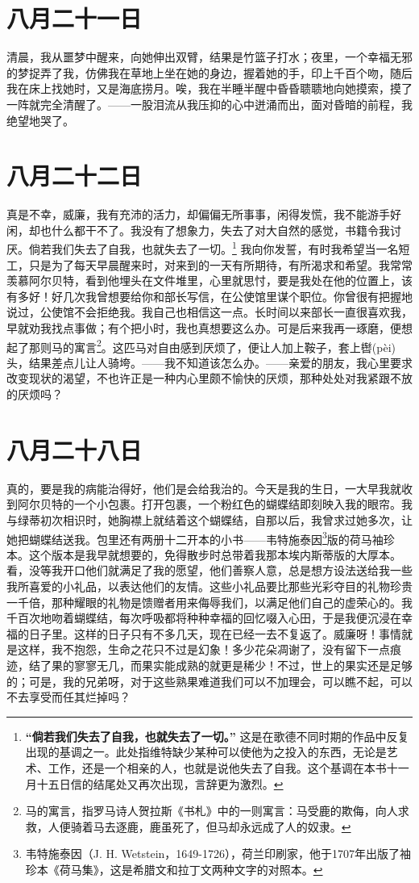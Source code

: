\documentclass[12pt,oneside]{book}
\begin{document}
\chapter{八月二十一日}
\label{sec-2-35}
清晨，我从噩梦中醒来，向她伸出双臂，结果是竹篮子打水；夜里，一个幸福无邪的梦捉弄了我，仿佛我在草地上坐在她的身边，握着她的手，印上千百个吻，随后我在床上找她时，又是海底捞月。唉，我在半睡半醒中昏昏聩聩地向她摸索，摸了一阵就完全清醒了。——一股泪流从我压抑的心中迸涌而出，面对昏暗的前程，我绝望地哭了。


\chapter{八月二十二日}
\label{sec-2-36}
真是不幸，威廉，我有充沛的活力，却偏偏无所事事，闲得发慌，我不能游手好闲，却也什么都干不了。我没有了想象力，失去了对大自然的感觉，书籍令我讨厌。倘若我们失去了自我，也就失去了一切。\footnote{\textbf{“倘若我们失去了自我，也就失去了一切。”} 这是在歌德不同时期的作品中反复出现的基调之一。此处指维特缺少某种可以使他为之投入的东西，无论是艺术、工作，还是一个相亲的人，也就是说他失去了自我。这个基调在本书十一月十五日信的结尾处又再次出现，言辞更为激烈。} 我向你发誓，有时我希望当一名短工，只是为了每天早晨醒来时，对来到的一天有所期待，有所渴求和希望。我常常羡慕阿尔贝特，看到他埋头在文件堆里，心里就思忖，要是我处在他的位置上，该有多好！好几次我曾想要给你和部长写信，在公使馆里谋个职位。你曾很有把握地说过，公使馆不会拒绝我。我自己也相信这一点。长时间以来部长一直很喜欢我，早就劝我找点事做；有个把小时，我也真想要这么办。可是后来我再一琢磨，便想起了那则马的寓言\footnote{马的寓言，指罗马诗人贺拉斯《书札》中的一则寓言：马受鹿的欺侮，向人求救，人便骑着马去逐鹿，鹿虽死了，但马却永远成了人的奴隶。}。这匹马对自由感到厌烦了，便让人加上鞍子，套上辔(pèi)头，结果差点儿让人骑垮。——我不知道该怎么办。——亲爱的朋友，我心里要求改变现状的渴望，不也许正是一种内心里颇不愉快的厌烦，那种处处对我紧跟不放的厌烦吗？


\chapter{八月二十八日}
\label{sec-2-37}
真的，要是我的病能治得好，他们是会给我治的。今天是我的生日，一大早我就收到阿尔贝特的一个小包裹。打开包裹，一个粉红色的蝴蝶结即刻映入我的眼帘。我与绿蒂初次相识时，她胸襟上就结着这个蝴蝶结，自那以后，我曾求过她多次，让她把蝴蝶结送我。包里还有两册十二开本的小书——韦特施泰因\footnote{韦特施泰因（J. H. Wetstein，1649-1726），荷兰印刷家，他于1707年出版了袖珍本《荷马集》，这是希腊文和拉丁文两种文字的对照本。}版的荷马袖珍本。这个版本是我早就想要的，免得散步时总带着我那本埃内斯蒂版的大厚本。看，没等我开口他们就满足了我的愿望，他们善察人意，总是想方设法送给我一些我所喜爱的小礼品，以表达他们的友情。这些小礼品要比那些光彩夺目的礼物珍贵一千倍，那种耀眼的礼物是馈赠者用来侮辱我们，以满足他们自己的虚荣心的。我千百次地吻着蝴蝶结，每次呼吸都将种种幸福的回忆啜入心田，于是我便沉浸在幸福的日子里。这样的日子只有不多几天，现在已经一去不复返了。威廉呀！事情就是这样，我不抱怨，生命之花只不过是幻象！多少花朵凋谢了，没有留下一点痕迹，结了果的寥寥无几，而果实能成熟的就更是稀少！不过，世上的果实还是足够的；可是，我的兄弟呀，对于这些熟果难道我们可以不加理会，可以瞧不起，可以不去享受而任其烂掉吗？
\end{document}
